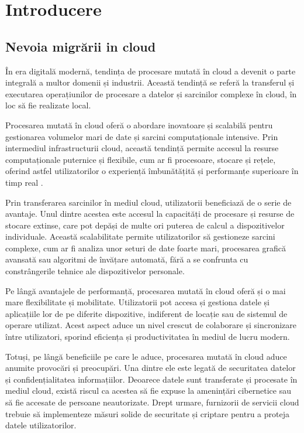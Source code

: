 \chapter{Introducere}

\section{Nevoia migrării in cloud}

În era digitală modernă, tendința de procesare mutată în cloud a devenit o parte integrală a multor domenii și industrii. Această tendință se referă la transferul și executarea operațiunilor de procesare a datelor și sarcinilor complexe în cloud, în loc să fie realizate local.

Procesarea mutată în cloud oferă o abordare inovatoare și scalabilă pentru gestionarea volumelor mari de date și sarcini computaționale intensive. Prin intermediul infrastructurii cloud, această tendință permite accesul la resurse computaționale puternice și flexibile, cum ar fi procesoare, stocare și rețele, oferind astfel utilizatorilor o experiență îmbunătățită și performanțe superioare în timp real \cite{benefits-of-cloud-computing}.

Prin transferarea sarcinilor în mediul cloud, utilizatorii beneficiază de o serie de avantaje. Unul dintre acestea este accesul la capacități de procesare și resurse de stocare extinse, care pot depăși de multe ori puterea de calcul a dispozitivelor individuale. Această scalabilitate permite utilizatorilor să gestioneze sarcini complexe, cum ar fi analiza unor seturi de date foarte mari, procesarea grafică avansată sau algoritmi de învățare automată, fără a se confrunta cu constrângerile tehnice ale dispozitivelor personale.

Pe lângă avantajele de performanță, procesarea mutată în cloud oferă și o mai mare flexibilitate și mobilitate. Utilizatorii pot accesa și gestiona datele și aplicațiile lor de pe diferite dispozitive, indiferent de locație sau de sistemul de operare utilizat. Acest aspect aduce un nivel crescut de colaborare și sincronizare între utilizatori, sporind eficiența și productivitatea în mediul de lucru modern.

Totuși, pe lângă beneficiile pe care le aduce, procesarea mutată în cloud aduce anumite provocări și preocupări. Una dintre ele este legată de securitatea datelor și confidențialitatea informațiilor. Deoarece datele sunt transferate și procesate în mediul cloud, există riscul ca acestea să fie expuse la amenințări cibernetice sau să fie accesate de persoane neautorizate. Drept urmare, furnizorii de servicii cloud trebuie să implementeze măsuri solide de securitate și criptare pentru a proteja datele utilizatorilor.

